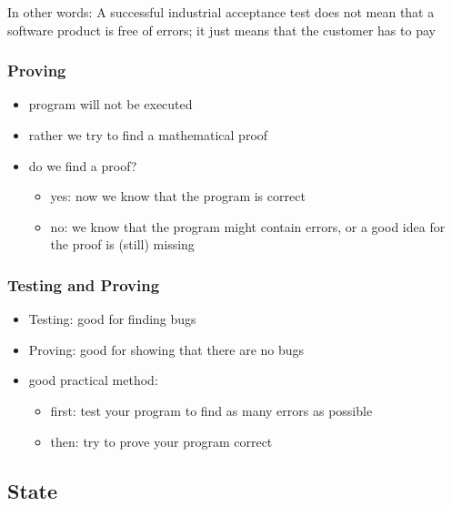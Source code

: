 In other words: A successful industrial acceptance test does not mean
that a software product is free of errors; it just means that the
customer has to pay

\hypertarget{proving}{%
\subsubsection{Proving}\label{proving}}

\begin{itemize}
\tightlist
\item
  program will not be executed
\item
  rather we try to find a mathematical proof
\item
  do we find a proof?

  \begin{itemize}
  \tightlist
  \item
    yes: now we know that the program is correct
  \item
    no: we know that the program might contain errors, or a good idea
    for the proof is (still) missing
  \end{itemize}
\end{itemize}

\hypertarget{testing-and-proving}{%
\subsubsection{Testing and Proving}\label{testing-and-proving}}

\begin{itemize}
\tightlist
\item
  Testing: good for finding bugs
\item
  Proving: good for showing that there are no bugs
\item
  good practical method:

  \begin{itemize}
  \tightlist
  \item
    first: test your program to find as many errors as possible
  \item
    then: try to prove your program correct
  \end{itemize}
\end{itemize}

\clearpage
\hypertarget{state}{%
\subsection{State}\label{state}}

